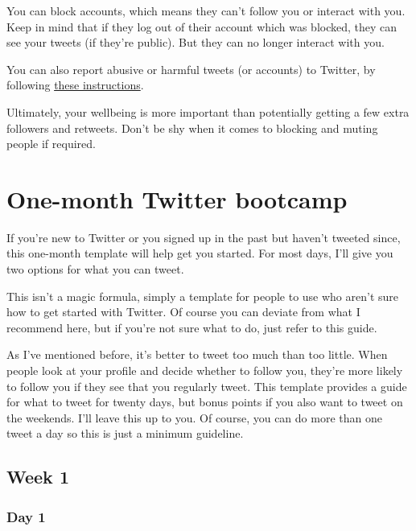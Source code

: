 \documentclass[
]{book}
\begin{document}
You can block accounts, which means they can't follow you or interact with you. Keep in mind that if they log out of their account which was blocked, they can see your tweets (if they're public). But they can no longer interact with you.

You can also report abusive or harmful tweets (or accounts) to Twitter, by following \href{https://help.twitter.com/en/safety-and-security/report-abusive-behavior}{these instructions}.

Ultimately, your wellbeing is more important than potentially getting a few extra followers and retweets. Don't be shy when it comes to blocking and muting people if required.

\hypertarget{one-month-twitter-bootcamp}{%
\chapter{One-month Twitter bootcamp}\label{one-month-twitter-bootcamp}}

If you're new to Twitter or you signed up in the past but haven't tweeted since, this one-month template will help get you started. For most days, I'll give you two options for what you can tweet.

This isn't a magic formula, simply a template for people to use who aren't sure how to get started with Twitter. Of course you can deviate from what I recommend here, but if you're not sure what to do, just refer to this guide.

As I've mentioned before, it's better to tweet too much than too little. When people look at your profile and decide whether to follow you, they're more likely to follow you if they see that you regularly tweet. This template provides a guide for what to tweet for twenty days, but bonus points if you also want to tweet on the weekends. I'll leave this up to you. Of course, you can do more than one tweet a day so this is just a minimum guideline.

\hypertarget{week-1}{%
\section*{Week 1}\label{week-1}}

\hypertarget{day-1}{%
\subsection*{Day 1}\label{day-1}}
\end{document}
